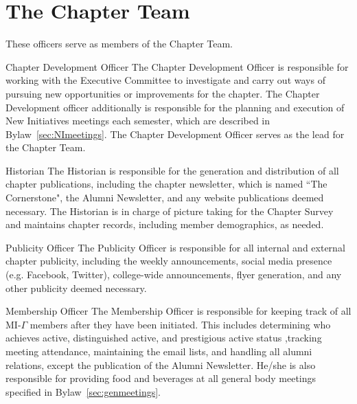 \section{The Chapter Team}\label{sec:ChapterTeam}
These officers serve as members of the Chapter Team.
\begin{enumsubsection}
\item{Chapter Development Officer} The Chapter Development Officer is responsible for working with the Executive Committee to investigate and carry out ways of pursuing new opportunities or improvements for the chapter. The Chapter Development officer additionally is responsible for the planning and execution of New Initiatives meetings each semester, which are described in Bylaw~\ref{sec:NImeetings}. The Chapter Development Officer serves as the lead for the Chapter Team. 

\item{Historian} The Historian is responsible for the generation and distribution of all chapter publications, including the chapter newsletter, which is named ``The Cornerstone", the Alumni Newsletter, and any website publications deemed necessary. The Historian is in charge of picture taking for the Chapter Survey and maintains chapter records, including member demographics, as needed. 

\item{Publicity Officer} The Publicity Officer is responsible for all internal and external chapter publicity, including the weekly announcements, social media presence (e.g. Facebook, Twitter), college-wide announcements, flyer generation, and any other publicity deemed necessary.

\item{Membership Officer} The Membership Officer is responsible for keeping track of all MI-$\Gamma$ members after they have been initiated. This includes determining who achieves active,  distinguished active, and prestigious active  status ,tracking meeting attendance, maintaining the email lists, and handling all alumni relations, except the publication of the Alumni Newsletter.  He/she is also responsible for providing food and beverages at all general body meetings specified in Bylaw~\ref{sec:genmeetings}.
\end{enumsubsection}
%
